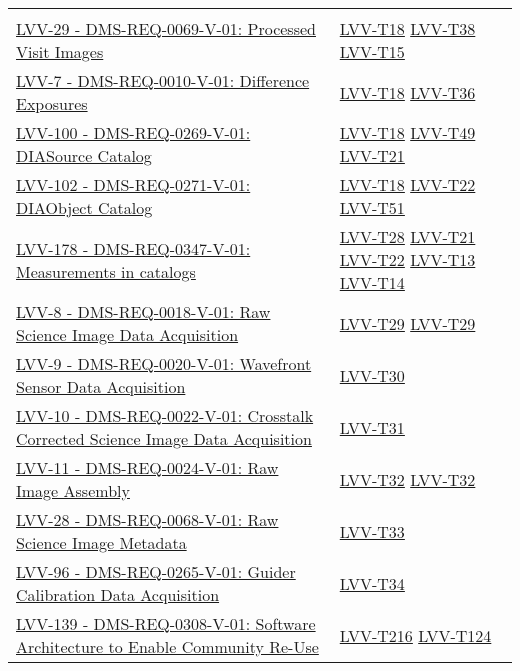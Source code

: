 {\begin{longtable}[]{p{13cm}p{3cm}}
{} \\
\href{https://jira.lsstcorp.org/browse/LVV-29}{LVV-29 - DMS-REQ-0069-V-01: Processed Visit Images}
& {
\hyperref[lvv-t18]{LVV-T18}
\hyperref[lvv-t38]{LVV-T38}
\hyperref[lvv-t15]{LVV-T15}
} \\
\href{https://jira.lsstcorp.org/browse/LVV-7}{LVV-7 - DMS-REQ-0010-V-01: Difference Exposures}
& {
\hyperref[lvv-t18]{LVV-T18}
\hyperref[lvv-t36]{LVV-T36}
} \\
\href{https://jira.lsstcorp.org/browse/LVV-100}{LVV-100 - DMS-REQ-0269-V-01: DIASource Catalog}
& {
\hyperref[lvv-t18]{LVV-T18}
\hyperref[lvv-t49]{LVV-T49}
\hyperref[lvv-t21]{LVV-T21}
} \\
\href{https://jira.lsstcorp.org/browse/LVV-102}{LVV-102 - DMS-REQ-0271-V-01: DIAObject Catalog}
& {
\hyperref[lvv-t18]{LVV-T18}
\hyperref[lvv-t22]{LVV-T22}
\hyperref[lvv-t51]{LVV-T51}
} \\
\href{https://jira.lsstcorp.org/browse/LVV-178}{LVV-178 - DMS-REQ-0347-V-01: Measurements in catalogs}
& {
\hyperref[lvv-t28]{LVV-T28}
\hyperref[lvv-t21]{LVV-T21}
\hyperref[lvv-t22]{LVV-T22}
\hyperref[lvv-t13]{LVV-T13}
\hyperref[lvv-t14]{LVV-T14}
} \\
\href{https://jira.lsstcorp.org/browse/LVV-8}{LVV-8 - DMS-REQ-0018-V-01: Raw Science Image Data Acquisition}
& {
\hyperref[lvv-t29]{LVV-T29}
\hyperref[lvv-t29]{LVV-T29}
} \\
\href{https://jira.lsstcorp.org/browse/LVV-9}{LVV-9 - DMS-REQ-0020-V-01: Wavefront Sensor Data Acquisition}
& {
\hyperref[lvv-t30]{LVV-T30}
} \\
\href{https://jira.lsstcorp.org/browse/LVV-10}{LVV-10 - DMS-REQ-0022-V-01: Crosstalk Corrected Science Image Data Acquisition}
& {
\hyperref[lvv-t31]{LVV-T31}
} \\
\href{https://jira.lsstcorp.org/browse/LVV-11}{LVV-11 - DMS-REQ-0024-V-01: Raw Image Assembly}
& {
\hyperref[lvv-t32]{LVV-T32}
\hyperref[lvv-t32]{LVV-T32}
} \\
\href{https://jira.lsstcorp.org/browse/LVV-28}{LVV-28 - DMS-REQ-0068-V-01: Raw Science Image Metadata}
& {
\hyperref[lvv-t33]{LVV-T33}
} \\
\href{https://jira.lsstcorp.org/browse/LVV-96}{LVV-96 - DMS-REQ-0265-V-01: Guider Calibration Data Acquisition}
& {
\hyperref[lvv-t34]{LVV-T34}
} \\
\href{https://jira.lsstcorp.org/browse/LVV-139}{LVV-139 - DMS-REQ-0308-V-01: Software Architecture to Enable Community Re-Use}
& {
\hyperref[lvv-t216]{LVV-T216}
\hyperref[lvv-t124]{LVV-T124}
} \\

\end{longtable}}
